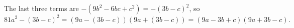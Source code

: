 The last three terms are $-(9b^2-6bc+c^2)=-(3b-c)^2$, so
\[
81a^2-(3b-c)^2=(9a-(3b-c))(9a+(3b-c))=\boxed{(9a-3b+c)(9a+3b-c)}.
\]
